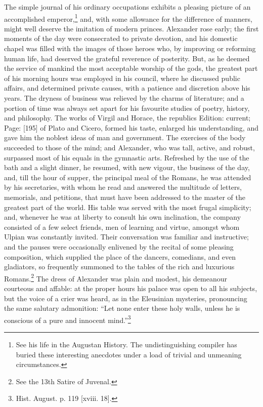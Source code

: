 The simple journal of his ordinary occupations exhibits a pleasing picture of an accomplished emperor,\footnote{See his life in the Augustan History. The undistinguishing compiler has buried these interesting anecdotes under a load of trivial and unmeaning circumstances.} and, with some allowance for the difference of manners, might well deserve the imitation of modern princes. Alexander rose early; the first moments of the day were consecrated to private devotion, and his domestic chapel was filled with the images of those heroes who, by improving or reforming human life, had deserved the grateful reverence of posterity. But, as he deemed the service of mankind the most acceptable worship of the gods, the greatest part of his morning hours was employed in his council, where he discussed public affairs, and determined private causes, with a patience and discretion above his years. The dryness of business was relieved by the charms of literature; and a portion of time was always set apart for his favourite studies of poetry, history, and philosophy. The works of Virgil and Horace, the republics Edition: current; Page: [195] of Plato and Cicero, formed his taste, enlarged his understanding, and gave him the noblest ideas of man and government. The exercises of the body succeeded to those of the mind; and Alexander, who was tall, active, and robust, surpassed most of his equals in the gymnastic arts. Refreshed by the use of the bath and a slight dinner, he resumed, with new vigour, the business of the day, and, till the hour of supper, the principal meal of the Romans, he was attended by his secretaries, with whom he read and answered the multitude of letters, memorials, and petitions, that must have been addressed to the master of the greatest part of the world. His table was served with the most frugal simplicity; and, whenever he was at liberty to consult his own inclination, the company consisted of a few select friends, men of learning and virtue, amongst whom Ulpian was constantly invited. Their conversation was familiar and instructive; and the pauses were occasionally enlivened by the recital of some pleasing composition, which supplied the place of the dancers, comedians, and even gladiators, so frequently summoned to the tables of the rich and luxurious Romans.\footnote{See the 13th Satire of Juvenal.} The dress of Alexander was plain and modest, his demeanour courteous and affable: at the proper hours his palace was open to all his subjects, but the voice of a crier was heard, as in the Eleusinian mysteries, pronouncing the same salutary admonition: \texthebrew{“}Let none enter these holy walls, unless he is conscious of a pure and innocent mind.\texthebrew{}”\footnote{Hist. August. p. 119 [xviii. 18].}

